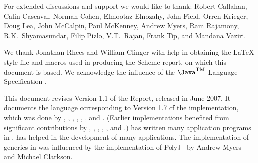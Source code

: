 For extended discussions and support we would like to thank: 
Robert Callahan, Calin
Cascaval, Norman Cohen, Elmootaz Elnozahy, John Field,
Orren Krieger, Doug Lea, John McCalpin, Paul McKenney, Andrew Myers,
Ram Rajamony,
R.K.~Shyamasundar, Filip Pizlo, V.T.~Rajan, Frank Tip, and Mandana Vaziri.

We thank Jonathan Rhees and William Clinger with help in obtaining the
\LaTeX{} style file and macros used in producing the Scheme report,
on which this document is based. We acknowledge the influence of
the $\mbox{\Java}^{\mbox{\textsc{tm}}}$ Language
Specification \cite{jls2}.

This document revises Version 1.1 of the Report, released in
June 2007.  It documents the language corresponding to Version
1.7 of the implementation, which was done by
, 
,  
,  
,
,  
, and
.
(Earlier implementations benefited from significant contributions by
, 
, 
,
,
, and
.)
 has written many application programs
in \Xten{}.  has helped in the
development of many applications.
The implementation of generics in \Xten{} was influenced by the
implementation of PolyJ~\cite{polyj} by Andrew Myers and Michael Clarkson.

